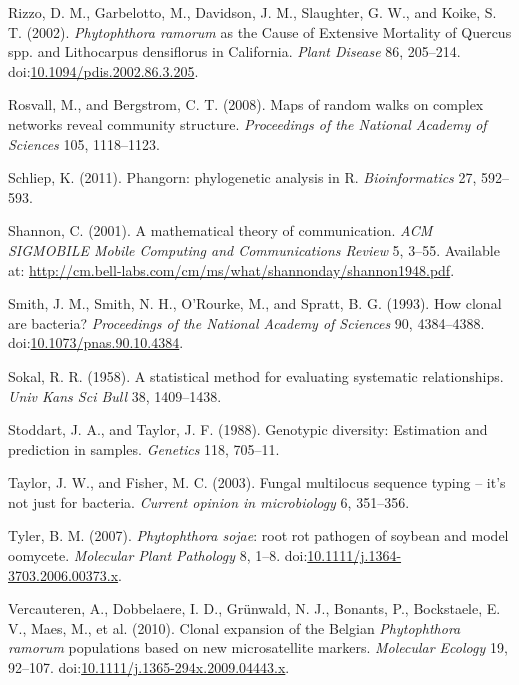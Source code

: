 \documentclass[double,12pt]{beavtex}
\begin{document}
  \hypertarget{ref-rizzo2002phytophthora}{}
  Rizzo, D. M., Garbelotto, M., Davidson, J. M., Slaughter, G. W., and
  Koike, S. T. (2002). \emph{Phytophthora ramorum} as the Cause of
  Extensive Mortality of Quercus spp. and Lithocarpus densiflorus in
  California. \emph{Plant Disease} 86, 205--214.
  doi:\href{https://doi.org/10.1094/pdis.2002.86.3.205}{10.1094/pdis.2002.86.3.205}.
  
  \hypertarget{ref-rosvall2008maps}{}
  Rosvall, M., and Bergstrom, C. T. (2008). Maps of random walks on
  complex networks reveal community structure. \emph{Proceedings of the
  National Academy of Sciences} 105, 1118--1123.
  
  \hypertarget{ref-phangorn}{}
  Schliep, K. (2011). Phangorn: phylogenetic analysis in R.
  \emph{Bioinformatics} 27, 592--593.
  
  \hypertarget{ref-shannon2001mathematical}{}
  Shannon, C. (2001). A mathematical theory of communication. \emph{ACM
  SIGMOBILE Mobile Computing and Communications Review} 5, 3--55.
  Available at:
  \url{http://cm.bell-labs.com/cm/ms/what/shannonday/shannon1948.pdf}.
  
  \hypertarget{ref-smith1993how}{}
  Smith, J. M., Smith, N. H., O'Rourke, M., and Spratt, B. G. (1993). How
  clonal are bacteria? \emph{Proceedings of the National Academy of
  Sciences} 90, 4384--4388.
  doi:\href{https://doi.org/10.1073/pnas.90.10.4384}{10.1073/pnas.90.10.4384}.
  
  \hypertarget{ref-sokal1958statistical}{}
  Sokal, R. R. (1958). A statistical method for evaluating systematic
  relationships. \emph{Univ Kans Sci Bull} 38, 1409--1438.
  
  \hypertarget{ref-stoddart1988genotypic}{}
  Stoddart, J. A., and Taylor, J. F. (1988). Genotypic diversity:
  Estimation and prediction in samples. \emph{Genetics} 118, 705--11.
  
  \hypertarget{ref-taylor2003fungal}{}
  Taylor, J. W., and Fisher, M. C. (2003). Fungal multilocus sequence
  typing -- it's not just for bacteria. \emph{Current opinion in
  microbiology} 6, 351--356.
  
  \hypertarget{ref-tyler2007phytophthora}{}
  Tyler, B. M. (2007). \emph{Phytophthora sojae}: root rot pathogen of
  soybean and model oomycete. \emph{Molecular Plant Pathology} 8, 1--8.
  doi:\href{https://doi.org/10.1111/j.1364-3703.2006.00373.x}{10.1111/j.1364-3703.2006.00373.x}.
  
  \hypertarget{ref-vercauteren2010clonal}{}
  Vercauteren, A., Dobbelaere, I. D., Grünwald, N. J., Bonants, P.,
  Bockstaele, E. V., Maes, M., et al. (2010). Clonal expansion of the
  Belgian \emph{Phytophthora ramorum} populations based on new
  microsatellite markers. \emph{Molecular Ecology} 19, 92--107.
  doi:\href{https://doi.org/10.1111/j.1365-294x.2009.04443.x}{10.1111/j.1365-294x.2009.04443.x}.
  
\end{document}
